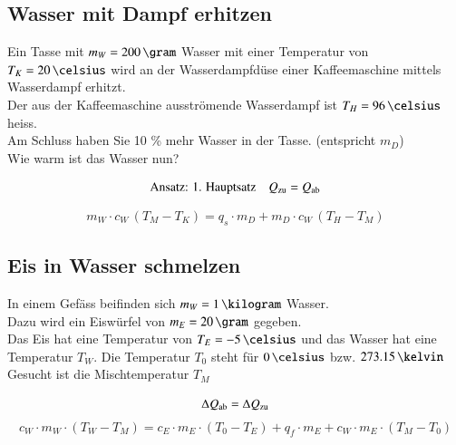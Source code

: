 \subsection{Wasser mit Dampf erhitzen}\label{subsec:Dampf}

Ein Tasse mit $m_W = 200 \, \gram$ Wasser  mit einer Temperatur von $T_K = 20 \, \celsius$ wird an
der Wasserdampfdüse einer Kaffeemaschine mittels Wasserdampf erhitzt. \\
Der aus der Kaffeemaschine ausströmende Wasserdampf ist $T_H = 96 \, \celsius$ heiss. \\
Am Schluss haben Sie 10 \% mehr Wasser in der Tasse. (entspricht $m_D$)\\
Wie warm ist das Wasser nun?

$$ \text{Ansatz: 1. Hauptsatz} \quad Q_{\rm zu} = Q_{\rm ab} $$ 

$$ m_W \cdot c_W \, (T_M - T_K) = q_s \cdot m_D + m_D \cdot c_W \, (T_H - T_M) $$


\subsection{Eis in Wasser schmelzen}

In einem Gefäss beifinden sich $m_W = 1 \, \kilogram$ Wasser. \\
Dazu wird ein Eiswürfel von $m_E = 20 \, \gram$ gegeben. \\
Das Eis hat eine Temperatur von $T_E = -5 \, \celsius$ und das Wasser hat eine Temperatur $T_W$. Die Temperatur $T_0$ steht 
für $0 \, \celsius$ bzw. $273.15 \, \kelvin$ \\
Gesucht ist die Mischtemperatur $T_M$ 

$$ \Delta Q_{\rm ab} = \Delta Q_{\rm zu} $$
$$ c_W \cdot m_W \cdot (T_W - T_M) = c_E \cdot m_E \cdot (T_0 - T_E) + q_f \cdot m_E + c_W \cdot m_E \cdot (T_M - T_0) $$


